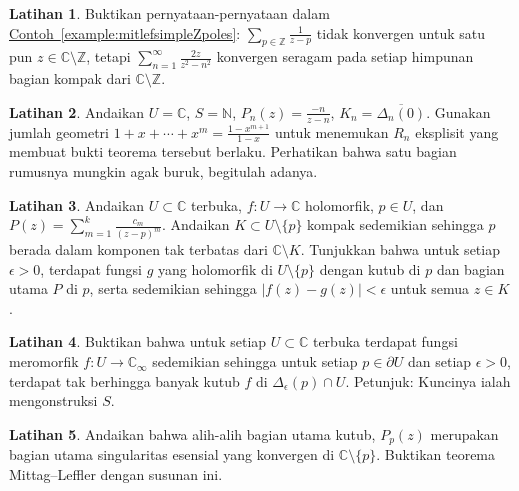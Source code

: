 \documentclass[12pt,openany]{book}
\newcommand{\sabs}[1]{\lvert {#1} \rvert}
\newcommand{\C}{{\mathbb{C}}}
\newcommand{\Z}{{\mathbb{Z}}}
\newcommand{\N}{{\mathbb{N}}}
\theoremstyle{plain}
\theoremstyle{remark}
\theoremstyle{definition}
\newenvironment{exbox}{%
    \def\FrameCommand{\vrule width 1pt \relax\hspace{10pt}}%
    \MakeFramed{\advance\hsize-\width\FrameRestore}%
}{%
    \endMakeFramed
}
\theoremstyle{exercise}
\newtheorem{exercise}{Latihan}[section]
\theoremstyle{example}
\newcommand{\exampleref}[1]{\hyperref[#1]{Contoh~\ref*{#1}}}
\begin{document}
\begin{exbox}
\begin{exercise} \label{exercise:mitlefsimpleZpoles}
Buktikan pernyataan-pernyataan dalam \exampleref{example:mitlefsimpleZpoles}:
$\sum_{p\in \Z} \frac{1}{z-p}$
tidak konvergen untuk satu pun $z \in \C \setminus \Z$, tetapi
$\sum_{n=1}^\infty
\frac{2z}{z^2-n^2}$
konvergen seragam pada setiap himpunan bagian kompak dari $\C \setminus \Z$.
\end{exercise}

\begin{exercise}\label{exercise:mitlefsimpleNpoles}
Andaikan $U = \C$, $S = \N$, $P_n(z) = \frac{-n}{z-n}$, $K_n =
\overline{\Delta_n(0)}$.  Gunakan jumlah geometri $1+x+\cdots+x^m =
\frac{1-x^{m+1}}{1-x}$ untuk menemukan $R_n$ eksplisit yang membuat bukti
teorema tersebut berlaku.
Perhatikan bahwa satu bagian rumusnya mungkin agak buruk, begitulah adanya.
\end{exercise}

\begin{exercise}
Andaikan $U \subset \C$ terbuka, $f \colon U \to \C$ holomorfik,
$p \in U$, dan
$P(z) = \sum_{m=1}^{k} \frac{c_m}{{(z-p)}^m}$.
Andaikan
$K \subset U \setminus \{ p \}$ kompak sedemikian sehingga $p$ berada dalam komponen tak terbatas
dari $\C \setminus K$.  Tunjukkan bahwa untuk setiap $\epsilon > 0$,
terdapat fungsi $g$ yang holomorfik di $U \setminus \{ p \}$
dengan kutub di $p$ dan bagian utama $P$ di $p$, serta sedemikian sehingga
$\sabs{f(z)-g(z)} < \epsilon$ untuk semua $z \in K$.
\end{exercise}

\begin{exercise}
Buktikan bahwa untuk setiap $U \subset \C$ terbuka terdapat fungsi meromorfik
$f \colon U \to \C_\infty$ sedemikian sehingga untuk setiap $p \in \partial U$
dan setiap $\epsilon > 0$, terdapat tak berhingga banyak kutub $f$ di
$\Delta_{\epsilon}(p) \cap U$.  Petunjuk: Kuncinya ialah mengonstruksi $S$.
\end{exercise}

\begin{exercise}
Andaikan bahwa alih-alih bagian utama kutub, $P_p(z)$ merupakan bagian
utama singularitas esensial yang konvergen di $\C \setminus \{ p \}$.
Buktikan teorema Mittag--Leffler dengan susunan ini.
\end{exercise}


\end{exbox}
\end{document}
